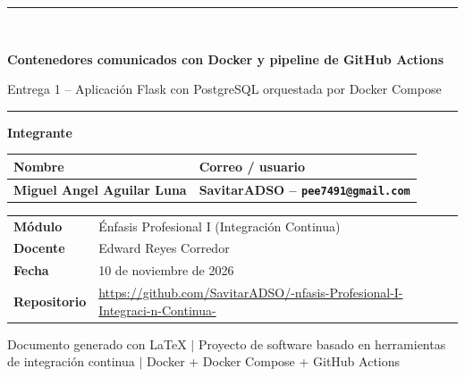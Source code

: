 \documentclass[12pt,a4paper]{article}
\makeatletter
\newcommand{\titulo}{Contenedores comunicados con Docker y pipeline de GitHub Actions}
\newcommand{\subtitulo}{Entrega 1 -- Aplicaci\'on Flask con PostgreSQL orquestada por Docker Compose}
\newcommand{\materia}{\'Enfasis Profesional I (Integraci\'on Continua)}
\newcommand{\docente}{Edward Reyes Corredor}
\newcommand{\repositorio}{\url{https://github.com/SavitarADSO/-nfasis-Profesional-I-Integraci-n-Continua-}}
\newcommand{\fechatexto}{10 de noviembre de 2026}
\newcommand{\integrante}{Miguel Angel Aguilar Luna}
\newcommand{\correointegrante}{SavitarADSO -- \texttt{pee7491@gmail.com}}
\makeatother
\begin{document}
\begin{titlepage}
\centering

\vspace*{1.2cm}
{\color{azulCJL}\rule{\textwidth}{1.6pt}}\\[0.5cm]
{\LARGE\bfseries\color{azulCJL} \titulo\par}
\vspace{0.5cm}
{\large \subtitulo\par}
\vspace{0.5cm}
{\color{azulCJL}\rule{\textwidth}{1.6pt}}

\vspace{1.4cm}
{\color{azulCJL}\large\bfseries Integrante\par}
\vspace{0.4cm}
\begin{minipage}{0.86\textwidth}
\small
\renewcommand{\arraystretch}{1.3}
\begin{tabularx}{\textwidth}{>{\bfseries}X >{\bfseries}X}
\textbf{Nombre} & \textbf{Correo / usuario} \\
\midrule
\integrante & \correointegrante \\
\end{tabularx}
\end{minipage}

\vfill

\begin{minipage}{0.86\textwidth}
\centering
\renewcommand{\arraystretch}{1.3}
\begin{tabularx}{\textwidth}{>{\bfseries}l X}
Módulo      & \materia \\
Docente      & \docente \\
Fecha        & \fechatexto \\
Repositorio  & \repositorio \\
\end{tabularx}
\end{minipage}

\vspace{1.2cm}
{\small\color{gris} Documento generado con LaTeX \quad$\vert$\quad
Proyecto de software basado en herramientas de integraci\'on continua \quad$\vert$\quad
Docker + Docker Compose + GitHub Actions}

\vspace{0.4cm}
\end{titlepage}
\end{document}
